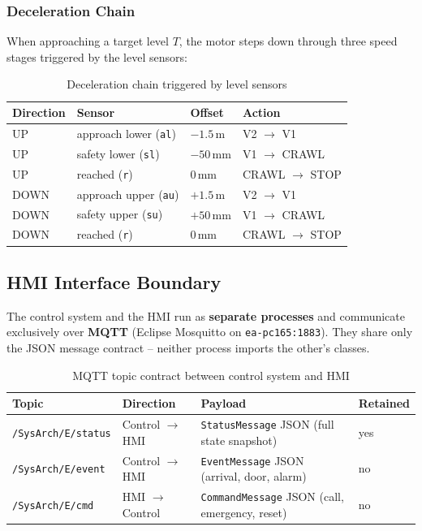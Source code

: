 \documentclass[12pt,a4paper]{article}
\begin{document}
\clearpage
\subsubsection{Deceleration Chain}

When approaching a target level $T$, the motor steps down through three speed
stages triggered by the level sensors:

\begin{table}[H]
\centering
\begin{tabular}{llll}
\toprule
\textbf{Direction} & \textbf{Sensor} & \textbf{Offset} & \textbf{Action} \\
\midrule
UP   & approach lower (\texttt{al}) & $-1.5$\,m  & V2 $\rightarrow$ V1 \\
UP   & safety lower   (\texttt{sl}) & $-50$\,mm  & V1 $\rightarrow$ CRAWL \\
UP   & reached        (\texttt{r})  & $0$\,mm    & CRAWL $\rightarrow$ STOP \\
\midrule
DOWN & approach upper (\texttt{au}) & $+1.5$\,m  & V2 $\rightarrow$ V1 \\
DOWN & safety upper   (\texttt{su}) & $+50$\,mm  & V1 $\rightarrow$ CRAWL \\
DOWN & reached        (\texttt{r})  & $0$\,mm    & CRAWL $\rightarrow$ STOP \\
\bottomrule
\end{tabular}
\caption{Deceleration chain triggered by level sensors}
\end{table}

\subsection{HMI Interface Boundary}

The control system and the HMI run as \textbf{separate processes} and communicate
exclusively over \textbf{MQTT} (Eclipse Mosquitto on \texttt{ea-pc165:1883}).
They share only the JSON message contract -- neither process imports the other's
classes.

\begin{table}[H]
\centering
\begin{tabularx}{\textwidth}{llXl}
\toprule
\textbf{Topic} & \textbf{Direction} & \textbf{Payload} & \textbf{Retained} \\
\midrule
\texttt{/SysArch/E/status} & Control $\to$ HMI & \texttt{StatusMessage} JSON (full state snapshot) & yes \\
\texttt{/SysArch/E/event}  & Control $\to$ HMI & \texttt{EventMessage} JSON (arrival, door, alarm)  & no  \\
\texttt{/SysArch/E/cmd}    & HMI $\to$ Control & \texttt{CommandMessage} JSON (call, emergency, reset) & no \\
\bottomrule
\end{tabularx}
\caption{MQTT topic contract between control system and HMI}
\end{table}
\end{document}

